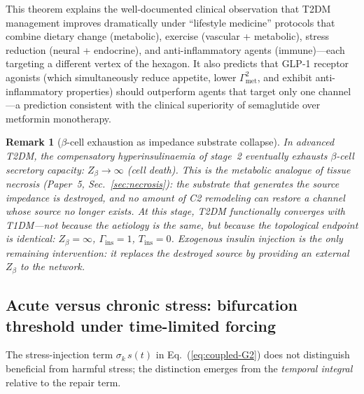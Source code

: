 \documentclass[aps,pre,twocolumn,superscriptaddress,floatfix]{revtex4-2}
\newtheorem{remark}{Remark}
\begin{document}
This theorem explains the well-documented clinical
observation that T2DM management improves
dramatically under ``lifestyle medicine''
protocols that combine dietary change (metabolic),
exercise (vascular + metabolic), stress reduction
(neural + endocrine), and anti-inflammatory
agents (immune)---each targeting a different
vertex of the hexagon.
It also predicts that GLP-1 receptor agonists
(which simultaneously reduce appetite, lower
$\Gamma_{\text{met}}^2$, and exhibit
anti-inflammatory properties) should outperform
agents that target only one channel---a prediction
consistent with the clinical superiority of
semaglutide over metformin monotherapy.

\begin{remark}[$\beta$-cell exhaustion as
impedance substrate collapse]
\label{rem:beta-exhaustion}
In advanced T2DM, the compensatory
hyperinsulinaemia of stage~2 eventually
exhausts $\beta$-cell secretory capacity:
$Z_\beta \to \infty$ (cell death).
This is the metabolic analogue of tissue
necrosis (Paper~5, Sec.~\ref{sec:necrosis}):
the substrate that \emph{generates} the
source impedance is destroyed, and no
amount of C2 remodeling can restore a
channel whose source no longer exists.
At this stage, T2DM functionally
converges with T1DM---not because the
aetiology is the same, but because the
\emph{topological endpoint} is identical:
$Z_\beta = \infty$, $\Gamma_{\text{ins}} = 1$,
$T_{\text{ins}} = 0$.
Exogenous insulin injection is the only
remaining intervention: it replaces the
destroyed source by providing an external
$Z_\beta$ to the network.
\end{remark}


\subsection{Acute versus chronic stress:
  bifurcation threshold under time-limited forcing}
\label{sec:acute-chronic}

The stress-injection term $\sigma_k\,s(t)$ in
Eq.~(\ref{eq:coupled-G2}) does not distinguish
beneficial from harmful stress; the distinction
emerges from the \emph{temporal integral} relative
to the repair term.
\end{document}
